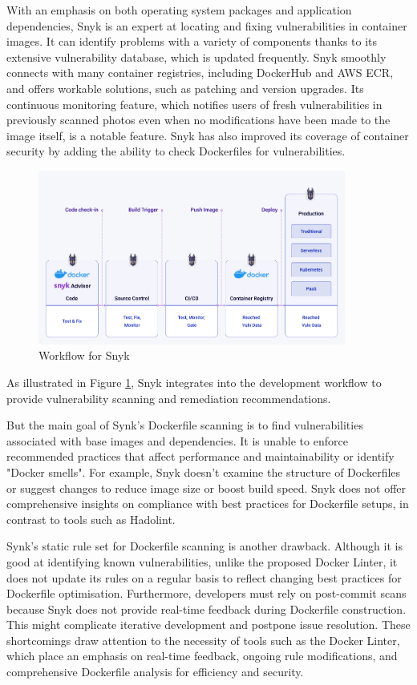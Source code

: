 With an emphasis on both operating system packages and application dependencies, Snyk is an expert at locating and fixing vulnerabilities in container images. It can identify problems with a variety of components thanks to its extensive vulnerability database, which is updated frequently. Snyk smoothly connects with many container registries, including DockerHub and AWS ECR, and offers workable solutions, such as patching and version upgrades. Its continuous monitoring feature, which notifies users of fresh vulnerabilities in previously scanned photos even when no modifications have been made to the image itself, is a notable feature. Snyk has also improved its coverage of container security by adding the ability to check Dockerfiles for vulnerabilities.\cite{snyk_2024}
\begin{figure}[ht]
  \centering
   \includegraphics[width=0.9\textwidth]{Figures/snyk.png}
  \caption{Workflow for Snyk \cite{snyk2023}} %
  \label{fig:2.6} %
\end{figure} 

As illustrated in Figure \ref{fig:2.6}, Snyk integrates into the development workflow to provide vulnerability scanning and remediation recommendations.

But the main goal of Synk's Dockerfile scanning is to find vulnerabilities associated with base images and dependencies. It is unable to enforce recommended practices that affect performance and maintainability or identify "Docker smells". For example, Snyk doesn't examine the structure of Dockerfiles or suggest changes to reduce image size or boost build speed. Snyk does not offer comprehensive insights on compliance with best practices for Dockerfile setups, in contrast to tools such as Hadolint.\cite{snyk2023}

Synk's static rule set for Dockerfile scanning is another drawback. Although it is good at identifying known vulnerabilities, unlike the proposed Docker Linter, it does not update its rules on a regular basis to reflect changing best practices for Dockerfile optimisation. Furthermore, developers must rely on post-commit scans because Snyk does not provide real-time feedback during Dockerfile construction. This might complicate iterative development and postpone issue resolution. These shortcomings draw attention to the necessity of tools such as the Docker Linter, which place an emphasis on real-time feedback, ongoing rule modifications, and comprehensive Dockerfile analysis for efficiency and security.

